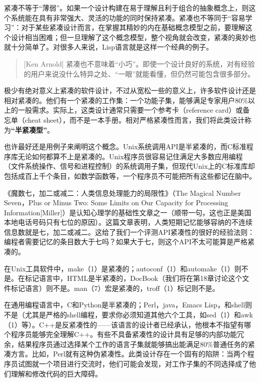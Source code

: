 \documentclass[12pt,oneside]{book}
\begin{document}
\begin{common-format}
紧凑不等于“薄弱”。如果一个设计构建在易于理解且利于组合的抽象概念上，则这个系统能在具有非常强大、灵活的功能的同时保持紧凑。紧凑也不等同于“容易学习”：对于某些紧凑设计而言，在掌握其精妙的内在基础概念模型之前，要理解这个设计相当困难；但一旦理解了这个概念模型，整个视角就会改变，紧凑的奥妙也就十分简单了。对很多人来说，Lisp语言就是这样一个经典的例子。

\begin{quote}[Ken Arnold]
紧凑也不意味着“小巧”。即使一个设计良好的系统，对有经验的用户来说没什么特异之处、“一眼”就能看懂，但仍然可能包含很多部分。
\end{quote}

极少有绝对意义上紧凑的软件设计，不过从宽松一些的意义上，许多软件设计还是相对紧凑的。他们有一个紧凑的工作集：一个功能子集，能够满足专家用户80\%以上的一般需求。实际上，这类设计通常只需要一个参考卡（reference card）或备忘单（cheat sheet），而不是一本手册。相对严格紧凑性而言，我们将此类设计称为\textbf{“半紧凑型”}。

也许最好还是用例子来阐明这个概念。Unix系统调用API是半紧凑的，而C标准程序库无论如何都算不上是紧凑的。Unix程序员很容易记住满足大多数应用编程（文件系统操作、信号和进程控制）的系统调用子集，但现代Unix上的C标准库却包括成百上千个条目，如数学函数等，一个程序员不可能把所有这些都记在脑中。

《魔数七，加二或减二：人类信息处理能力的局限性》（The Magical Number Seven，Plus or Minus Two: Some Limits on Our Capacity for Processing Information[Miller]）是认知心理学的基础性文章之一（顺带一句，这也正是美国本地电话号码只有七位的原因）。这篇文章表明，人类短期记忆能够容纳的不连续信息数就是七，加二或减二。这给了我们一个评测API紧凑性的很好的经验法则：编程者需要记忆的条目数大于七吗？如果大于七，则这个API不太可能算是严格紧凑的。

在Unix工具软件中，make（1）是紧凑的；autoconf（1）和automake（1）则不是。在标记语言中，HTML是半紧凑的，DocBook（我们将在第18章讨论这个文件标记语言）则不是。man（7）宏是紧凑的，troff（1）标记则不是。

在通用编程语言中，C和Python是半紧凑的；Perl，java，Emacs Lisp，和shell则不是（尤其是严格的shell编程，要求你必须知道其他六个工具，如sed（1）和awk（1）等）。C++是反紧凑性的——该语言的设计者已经承认，他根本不指望有哪个程序员能够完全理解C++。有些不具备紧凑性的设计具有足够的内部功能冗余，结果程序员通过选择某个工作的语言子集就能够搞出能满足80\%普通任务的紧凑方言。比如，Perl就有这种伪紧凑性。此类设计存在一个固有的陷阱：当两个程序员试图就一个项目进行交流时，他们可能会发现，对工作子集的不同选择成了他们理解和修改代码的巨大障碍。


\end{common-format}
\end{document}
